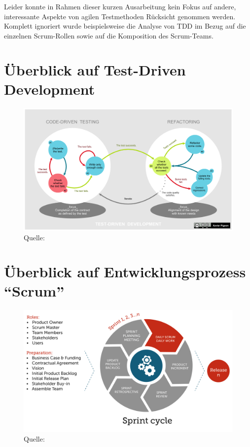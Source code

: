 \documentclass[12pt,DIV14,BCOR10mm,a4paper,twoside,parskip=half-,headsepline,headinclude,english,ngerman,bibliography=totocnumbered]{scrreprt}
\begin{document}
Leider konnte in Rahmen dieser kurzen Ausarbeitung kein Fokus auf andere, interessante Aspekte von agilen Testmethoden Rücksicht genommen werden.
Komplett ignoriert wurde beispielsweise die Analyse von TDD im Bezug auf die einzelnen Scrum-Rollen sowie auf die Komposition des Scrum-Teams.

\nocite{*}
\printbibliography

\begin{appendices}


\chapter{Überblick auf Test-Driven Development}
\begin{figure}[!htb]
  \includegraphics[width=\textwidth,height=0.85\textheight,keepaspectratio]{./images/1920px-TDD_Global_Lifecycle.png}
  \caption{Quelle: \autocite{TDD.Picture}}
  \label{figure:tdd-overview}
\end{figure}

\chapter{Überblick auf Entwicklungsprozess \enquote{Scrum}}
\begin{figure}[!htb]
  \includegraphics[width=\textwidth,height=0.9\textheight,keepaspectratio]{./images/the-daily-scrum-in-the-sprint-cycle.png}
  \caption{Quelle: \autocite{ManifestoDigital}}
  \label{figure:scrum-overview}
\end{figure}

\end{appendices}
\end{document}
